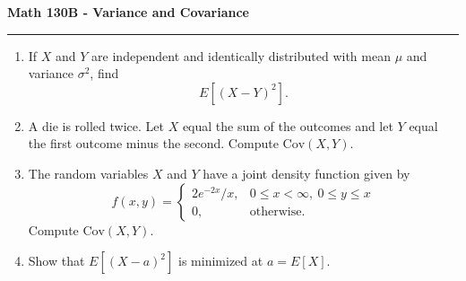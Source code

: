 \documentclass[11pt,letterpaper]{report}
\newcommand{\Cov}{\text{Cov}}
\begin{document}
\begin{center}
{\bf \Large Math 130B - Variance and Covariance}
\vspace{0.2cm}
\hrule
\end{center}

\begin{enumerate}
	\item If $X$ and $Y$ are independent and identically distributed with mean $\mu$ and variance $\sigma^2$, find
	\[
	E[(X-Y)^2].
	\]

	\vfill

	\item A die is rolled twice. Let $X$ equal the sum of the outcomes and let $Y$ equal the first outcome minus the second. Compute $\Cov(X, Y)$.

	\vfill

	\item The random variables $X$ and $Y$ have a joint density function given by
	\[
	f(x,y) = \begin{cases}
		2e^{-2x}/x,& 0\leq x<\infty,\ 0\leq y\leq x\\
		0,&\text{otherwise.}
	\end{cases}
	\]
	Compute $\Cov(X, Y)$.

	\vfill

	\item Show that $E[(X-a)^2]$ is minimized at $a = E[X]$.

	\vfill
\end{enumerate}
\end{document}
